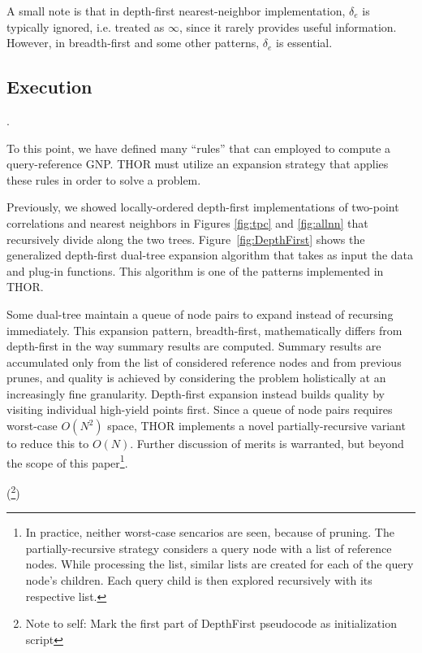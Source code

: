 \documentclass[twoside,leqno,twocolumn]{article}
\newcommand{\authornote}[1]{(\footnote{Note to self: #1})}
\newcommand{\authorsnote}[1]{\authornote{#1}}
\newcommand{\summary}{\delta}
\newcommand{\fig}[1]{Figure~\ref{fig:#1}}
\newcommand{\mysub}[1]{\subsection{#1}. }
\newcommand{\lettermu}{e}
\newcommand{\deltamu}{\summary_{\lettermu}}
\begin{document}
\noindent A small note is that in depth-first nearest-neighbor implementation, $\deltamu$ is typically ignored, i.e. treated as $\infty$, since it rarely provides useful information.
However, in breadth-first and some other patterns, $\deltamu$ is essential.

\mysub{Execution}

To this point, we have defined many ``rules'' that can employed to compute a query-reference GNP.
THOR must utilize an expansion strategy that applies these rules in order to solve a problem.

Previously, we showed locally-ordered depth-first implementations of two-point correlations and nearest neighbors in Figures \ref{fig:tpc} and \ref{fig:allnn} that recursively divide along the two trees.
\fig{DepthFirst} shows the generalized depth-first dual-tree expansion algorithm that takes as input the data and plug-in functions.
This algorithm is one of the patterns implemented in THOR.

Some dual-tree maintain a queue of node pairs to expand instead of recursing immediately.
This expansion pattern, breadth-first, mathematically differs from depth-first in the way summary results are computed.
Summary results are accumulated only from the list of considered reference nodes and from previous prunes, and quality is achieved by considering the problem holistically at an increasingly fine granularity.
Depth-first expansion instead builds quality by visiting individual high-yield points first.
Since a queue of node pairs requires worst-case $O(N^2)$ space, THOR implements a novel partially-recursive variant to reduce this to $O(N)$.
Further discussion of merits is warranted, but beyond the scope of this paper\footnote{
  In practice, neither worst-case sencarios are seen, because of pruning.
  The partially-recursive strategy considers a query node with a list of reference nodes.
  While processing the list, similar lists are created for each of the query node's children.
  Each query child is then explored recursively with its respective list.}.

\authorsnote{Mark the first part of DepthFirst pseudocode as initialization script}
\end{document}
